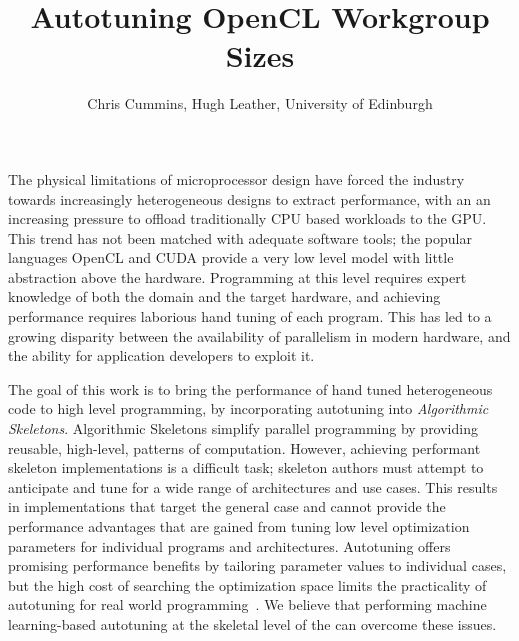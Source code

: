 \documentclass[times, 10pt,twocolumn]{article}
\begin{document}
  \title{
  \vspace{-0.8in}
  Autotuning OpenCL Workgroup Sizes
  \vspace{-0.2in}
  }
  \author{Chris Cummins, Hugh Leather, University of Edinburgh
  }

  \vspace{-3em}
  \maketitle
  \vspace{-3em}
  \thispagestyle{empty}

  The physical limitations of microprocessor design have forced the
  industry towards increasingly heterogeneous designs to extract
  performance, with an an increasing pressure to offload traditionally
  CPU based workloads to the GPU. This trend has not been matched with
  adequate software tools; the popular languages OpenCL and CUDA provide
  a very low level model with little abstraction above the
  hardware. Programming at this level requires expert knowledge of both
  the domain and the target hardware, and achieving performance requires
  laborious hand tuning of each program. This has led to a growing
  disparity between the availability of parallelism in modern hardware,
  and the ability for application developers to exploit it.

  The goal of this work is to bring the performance of hand tuned
  heterogeneous code to high level programming, by incorporating
  autotuning into \textit{Algorithmic Skeletons}. Algorithmic Skeletons
  simplify parallel programming by providing reusable, high-level,
  patterns of computation. However, achieving performant skeleton
  implementations is a difficult task; skeleton authors must attempt to
  anticipate and tune for a wide range of architectures and use
  cases. This results in implementations that target the general case
  and cannot provide the performance advantages that are gained from
  tuning low level optimization parameters for individual programs and
  architectures. Autotuning offers promising performance benefits by
  tailoring parameter values to individual cases, but the high cost of
  searching the optimization space limits the practicality of autotuning
  for real world programming~\cite{Ansel2013,Nugteren2015}. We believe
  that performing machine learning-based autotuning at the skeletal
  level of the can overcome these issues.
\end{document}
